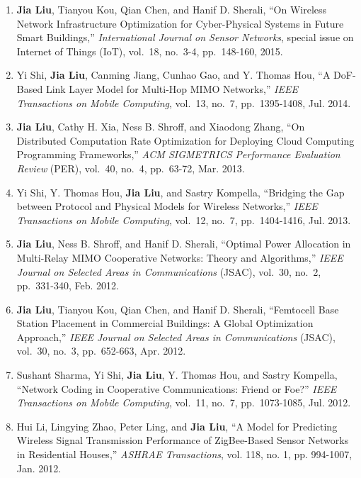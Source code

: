 \documentclass[overlapped,line,letterpaper]{res1}
\begin{document}
\begin{resume}
\begin{enumerate}
\vspace {.08in} \item \textbf{Jia Liu}, Tianyou Kou, Qian Chen, and Hanif D. Sherali, ``On Wireless Network Infrastructure Optimization for Cyber-Physical Systems in Future Smart Buildings,'' {\em International Journal on Sensor Networks}, special issue on Internet of Things (IoT), vol.~18, no.~3-4, pp.~148-160, 2015.

\vspace {.08in} \item Yi Shi, \textbf{Jia Liu}, Canming Jiang, Cunhao Gao, and Y. Thomas Hou, ``A DoF-Based Link Layer Model for Multi-Hop MIMO Networks,'' {\em IEEE Transactions on Mobile Computing}, vol.~13, no.~7, pp.~1395-1408, Jul. 2014.

\vspace{.08in} \item \textbf{Jia Liu}, Cathy H. Xia, Ness B. Shroff, and Xiaodong Zhang, ``On Distributed Computation Rate Optimization for Deploying Cloud Computing Programming Frameworks,'' {\em ACM SIGMETRICS Performance Evaluation Review} (PER), vol.~40, no.~4, pp.~63-72, Mar. 2013.

\vspace{.08in} \item Yi Shi, Y. Thomas Hou, \textbf{Jia Liu}, and Sastry Kompella, ``Bridging the Gap between Protocol and Physical Models for Wireless Networks,'' {\em IEEE Transactions on Mobile Computing}, vol.~12, no.~7, pp.~1404-1416, Jul. 2013.

\vspace {.08in} \item \textbf{Jia Liu}, Ness B. Shroff, and Hanif D. Sherali, ``Optimal Power Allocation in Multi-Relay MIMO Cooperative Networks: Theory and Algorithms,'' {\em IEEE Journal on Selected Areas in Communications} (JSAC), vol.~30, no.~2, pp.~331-340, Feb. 2012.

\vspace {.08in} \item \textbf{Jia Liu}, Tianyou Kou, Qian Chen, and Hanif D. Sherali, ``Femtocell Base Station Placement in Commercial Buildings: A Global Optimization Approach,'' {\em IEEE Journal on Selected Areas in Communications} (JSAC), vol.~30, no.~3, pp.~652-663, Apr. 2012.

\vspace {.08in} \item Sushant Sharma, Yi Shi, \textbf{Jia Liu}, Y. Thomas Hou, and Sastry Kompella, ``Network Coding in Cooperative Communications: Friend or Foe?'' {\em IEEE Transactions on Mobile Computing}, vol.~11, no.~7, pp.~1073-1085, Jul. 2012.

\vspace {.08in} \item Hui Li, Lingying Zhao, Peter Ling, and \textbf{Jia Liu}, ``A Model for Predicting Wireless Signal Transmission Performance of ZigBee-Based Sensor Networks in Residential Houses,'' {\em ASHRAE Transactions}, vol. 118, no. 1, pp. 994-1007, Jan. 2012.



\end{enumerate}
\end{resume}
\end{document}
